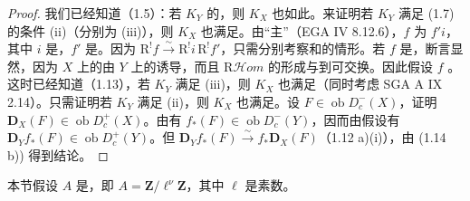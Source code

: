 \begin{proof}
我们已经知道（1.5）：若 $K_Y$ 的，则 $K_X$ 也如此。来证明若 $K_Y$ 满足 (1.7) 的条件 (ii)（分别为 (iii)），则 $K_X$ 也满足。由“主”（EGA IV 8.12.6），$f$ 为 $f'i$，其中 $i$ 是，$f'$ 是。因为 $\mathrm R^!f\xrightarrow{\sim}\mathrm R^!i\,\mathrm R^!f'$，只需分别考察和的情形。若 $f$ 是，断言显然，因为 $X$ 上的由 $Y$ 上的诱导，而且 $\mathrm R\mathcal Hom$ 的形成与到可交换。因此假设 $f$ 。这时已经知道（1.13），若 $K_Y$ 满足 (iii)，则 $K_X$ 也满足（同时考虑 SGA A IX 2.14）。只需证明若 $K_Y$ 满足 (ii)，则 $K_X$ 也满足。设 $F\in\operatorname{ob}D_c^-(X)$，证明 $\mathbf D_X(F)\in\operatorname{ob}D_c^+(X)$。由有 $f_*(F)\in\operatorname{ob}D_c^-(Y)$，因而由假设有 $\mathbf D_Yf_*(F)\in\operatorname{ob}D_c^+(Y)$。但 $\mathbf D_Yf_*(F)\xrightarrow{\sim}f_*\mathbf D_X(F)$（1.12 a)(i)），由 (1.14 b)) 得到结论。
\end{proof}

本节假设 $A$ 是，即 $A=\mathbf Z/\ell^\nu\mathbf Z$，其中 $\ell$ 是素数。

